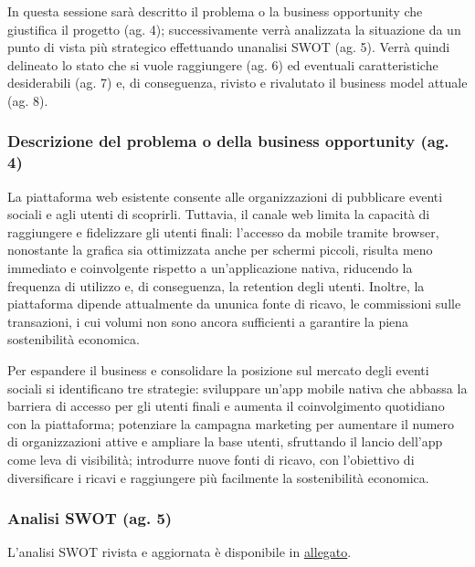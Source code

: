 \documentclass[11pt,a4paper]{article}
\begin{document}
{In questa sessione sarà descritto il problema o la business opportunity che giustifica il progetto (ag. 4); successivamente verrà analizzata la situazione da un punto di vista più strategico effettuando un\textquotesingle analisi SWOT (ag. 5). Verrà quindi delineato lo stato che si vuole raggiungere (ag. 6) ed eventuali caratteristiche desiderabili (ag. 7) e, di conseguenza, rivisto e rivalutato il business model attuale (ag. 8). }

\subsubsection{\texorpdfstring{{Descrizione del problema o della business opportunity (ag. 4)}}{Descrizione del problema o della business opportunity (ag. 4)}}\label{h.2j79oh93vnfk}

{La piattaforma web esistente consente alle organizzazioni di pubblicare eventi sociali e agli utenti di scoprirli. Tuttavia, il canale web limita la capacità di raggiungere e fidelizzare gli utenti finali: l’accesso da mobile tramite browser, nonostante la grafica sia ottimizzata anche per schermi piccoli, risulta meno immediato e coinvolgente rispetto a un’applicazione nativa, riducendo la frequenza di utilizzo e, di conseguenza, la retention degli utenti. Inoltre, la piattaforma dipende attualmente da un\textquotesingle unica fonte di ricavo, le commissioni sulle transazioni, i cui volumi non sono ancora sufficienti a garantire la piena sostenibilità economica.}

{Per espandere il business e consolidare la posizione sul mercato degli eventi sociali si identificano tre strategie: sviluppare un’app mobile nativa che abbassa la barriera di accesso per gli utenti finali e aumenta il coinvolgimento quotidiano con la piattaforma; potenziare la campagna marketing per aumentare il numero di organizzazioni attive e ampliare la base utenti, sfruttando il lancio dell’app come leva di visibilità; introdurre nuove fonti di ricavo, con l’obiettivo di diversificare i ricavi e raggiungere più facilmente la sostenibilità economica.}

\subsubsection{\texorpdfstring{{Analisi SWOT (ag. 5)}}{Analisi SWOT (ag. 5)}}\label{h.sfbyyd4btbgl}

{L’analisi SWOT rivista e aggiornata è disponibile in  \hyperref[sec:swot]{allegato}.}
\end{document}
